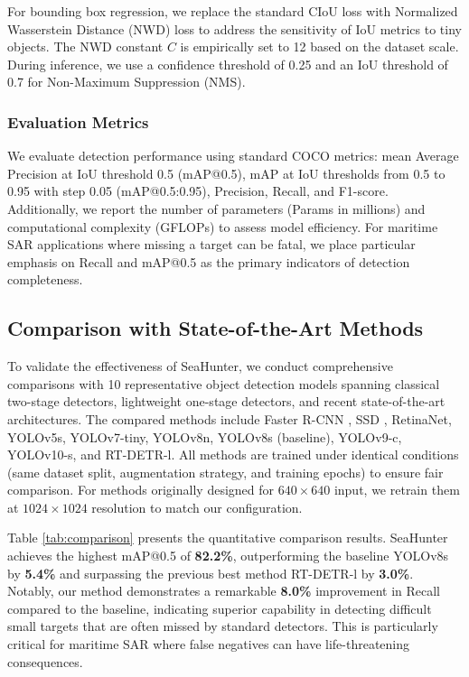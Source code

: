 \documentclass[lettersize,journal]{IEEEtran}
\begin{document}
For bounding box regression, we replace the standard CIoU loss with Normalized Wasserstein Distance (NWD) loss to address the sensitivity of IoU metrics to tiny objects. The NWD constant $C$ is empirically set to 12 based on the dataset scale. During inference, we use a confidence threshold of 0.25 and an IoU threshold of 0.7 for Non-Maximum Suppression (NMS).

\subsubsection{Evaluation Metrics}
We evaluate detection performance using standard COCO metrics: mean Average Precision at IoU threshold 0.5 (mAP@0.5), mAP at IoU thresholds from 0.5 to 0.95 with step 0.05 (mAP@0.5:0.95), Precision, Recall, and F1-score. Additionally, we report the number of parameters (Params in millions) and computational complexity (GFLOPs) to assess model efficiency. For maritime SAR applications where missing a target can be fatal, we place particular emphasis on Recall and mAP@0.5 as the primary indicators of detection completeness.


\subsection{Comparison with State-of-the-Art Methods}

To validate the effectiveness of SeaHunter, we conduct comprehensive comparisons with 10 representative object detection models spanning classical two-stage detectors, lightweight one-stage detectors, and recent state-of-the-art architectures. The compared methods include Faster R-CNN \cite{ref8}, SSD \cite{ref9}, RetinaNet, YOLOv5s, YOLOv7-tiny, YOLOv8n, YOLOv8s (baseline), YOLOv9-c, YOLOv10-s, and RT-DETR-l. All methods are trained under identical conditions (same dataset split, augmentation strategy, and training epochs) to ensure fair comparison. For methods originally designed for $640 \times 640$ input, we retrain them at $1024 \times 1024$ resolution to match our configuration.

Table \ref{tab:comparison} presents the quantitative comparison results. SeaHunter achieves the highest mAP@0.5 of \textbf{82.2\%}, outperforming the baseline YOLOv8s by \textbf{5.4\%} and surpassing the previous best method RT-DETR-l by \textbf{3.0\%}. Notably, our method demonstrates a remarkable \textbf{8.0\%} improvement in Recall compared to the baseline, indicating superior capability in detecting difficult small targets that are often missed by standard detectors. This is particularly critical for maritime SAR where false negatives can have life-threatening consequences.
\end{document}

